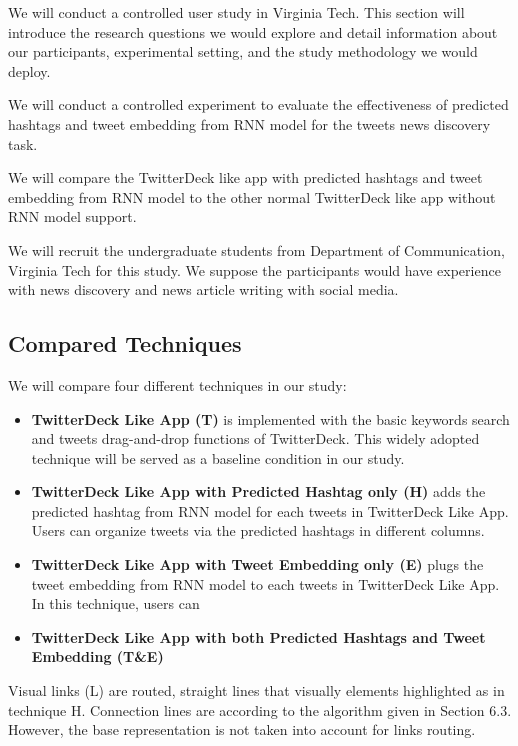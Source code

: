 We will conduct a controlled user study in Virginia Tech. This section will introduce the research questions we would explore and detail information about our participants, experimental setting, and the study methodology we would deploy. 

We will conduct a controlled experiment to evaluate the effectiveness of predicted hashtags and tweet embedding from RNN model for the tweets news discovery task.    

We will compare the TwitterDeck like app with predicted hashtags and tweet embedding from RNN model to the other normal TwitterDeck like app without RNN model support.  

We  will recruit the undergraduate students from Department of Communication, Virginia Tech for this study. We suppose the participants would have experience with news discovery and news article writing with social media.

\subsection{Compared Techniques}

We will compare four different techniques in our study:

\begin{itemize}
  \item \textbf{TwitterDeck Like App (T)} is implemented with the basic keywords search and tweets drag-and-drop functions of TwitterDeck. This widely adopted technique will be served as a baseline condition in our study. 
  
  \item \textbf{TwitterDeck Like App with Predicted Hashtag only (H)} adds the predicted hashtag from RNN model for each tweets in TwitterDeck Like App. Users can organize tweets via the predicted hashtags in different columns.   

  \item \textbf{TwitterDeck Like App with Tweet Embedding only (E)} plugs the tweet embedding from RNN model to each tweets in TwitterDeck Like App. In this technique, users can 
  
  \item \textbf{TwitterDeck Like App with both Predicted Hashtags and Tweet Embedding (T\&E)}
  
\end{itemize}


Visual links (L) are  routed, straight lines that visually elements highlighted as in technique H. Connection lines are according to the algorithm given in Section 6.3. However, the base representation is not taken into account for links routing.

